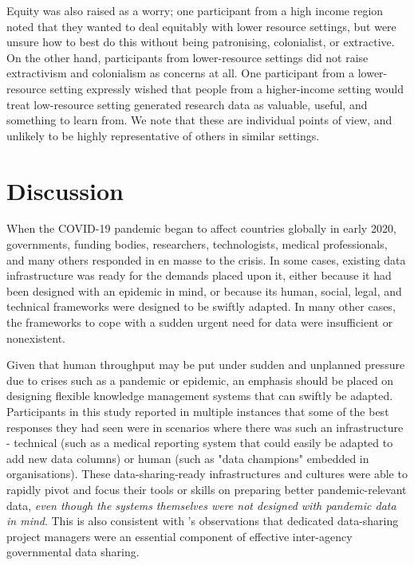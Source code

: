 \documentclass{CUP-JNL-DAP}%
\begin{document}
Equity was also raised as a worry; one participant from a high income region noted that they wanted to deal equitably with lower resource settings, but were unsure how to best do this without being patronising, colonialist, or extractive. On the other hand, participants from lower-resource settings did not raise extractivism and colonialism as concerns at all. One participant from a lower-resource setting expressly wished that people from a higher-income setting would treat low-resource setting generated research data as valuable, useful, and something to learn from. We note that these are individual points of view, and unlikely to be highly representative of others in similar settings. 

\section{Discussion}

When the COVID-19 pandemic began to affect countries globally in early 2020, governments, funding bodies, researchers, technologists, medical professionals, and many others responded in en masse to the crisis. In some cases, existing data infrastructure was ready for the demands placed upon it, either because it had been designed with an epidemic in mind, or because its human, social, legal, and technical frameworks were designed to be swiftly adapted. In many other cases, the frameworks to cope with a sudden urgent need for data were insufficient or nonexistent. 

Given that human throughput may be put under sudden and unplanned pressure due to crises such as a pandemic or epidemic, an emphasis should be placed on designing flexible knowledge management systems that can swiftly be adapted. Participants in this study reported in multiple instances that some of the best responses they had seen were in scenarios where there was such an infrastructure - technical (such as a medical reporting system that could easily be adapted to add new data columns) or human (such as "data champions" embedded in organisations). These data-sharing-ready infrastructures and cultures were able to rapidly pivot and focus their tools or skills on preparing better pandemic-relevant data, \textit{even though the systems themselves were not designed with pandemic data in mind}. This is also consistent with \cite{gil-garcia_government_2016}'s observations that dedicated data-sharing project managers were an essential component of effective inter-agency governmental data sharing.
\end{document}
